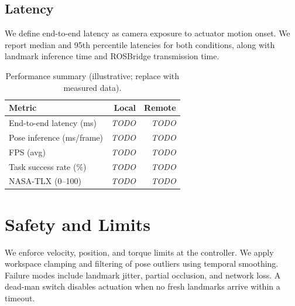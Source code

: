 \documentclass[sigconf]{acmart}
\begin{document}


\subsection{Latency}\label{sec:latency}
We define end-to-end latency as camera exposure to actuator motion onset. We report median and 95th percentile latencies for both conditions, along with landmark inference time and ROSBridge transmission time.

\begin{table}[htbp]
  \caption{Performance summary (illustrative; replace with measured data).}
  \label{tab:perf}
  \begin{tabular}{lrr}
    \toprule
    Metric & Local & Remote \\
    \midrule
    End-to-end latency (ms) &  \textit{TODO} & \textit{TODO} \\
    Pose inference (ms/frame) & \textit{TODO} & \textit{TODO} \\
    FPS (avg) & \textit{TODO} & \textit{TODO} \\
    Task success rate (\%) & \textit{TODO} & \textit{TODO} \\
    NASA-TLX (0--100) & \textit{TODO} & \textit{TODO} \\
    \bottomrule
  \end{tabular}
\end{table}

\section{Safety and Limits}
We enforce velocity, position, and torque limits at the controller. We apply workspace clamping and filtering of pose outliers using temporal smoothing. Failure modes include landmark jitter, partial occlusion, and network loss. A dead-man switch disables actuation when no fresh landmarks arrive within a timeout.
\end{document}
